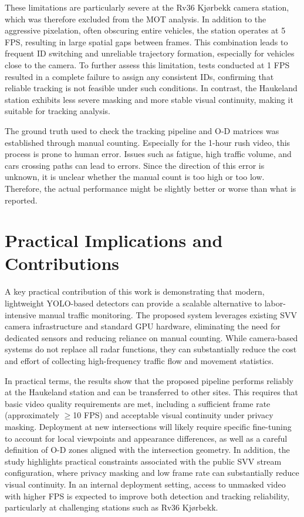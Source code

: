These limitations are particularly severe at the Rv36 Kjørbekk camera station, which was therefore excluded from the MOT analysis. In addition to the aggressive pixelation, often obscuring entire vehicles, the station operates at 5 FPS, resulting in large spatial gaps between frames. This combination leads to frequent ID switching and unreliable trajectory formation, especially for vehicles close to the camera. To further assess this limitation, tests conducted at 1 FPS resulted in a complete failure to assign any consistent IDs, confirming that reliable tracking is not feasible under such conditions. In contrast, the Haukeland station exhibits less severe masking and more stable visual continuity, making it suitable for tracking analysis.

The ground truth used to check the tracking pipeline and O-D matrices was established through manual counting. Especially for the 1-hour rush video, this process is prone to human error. Issues such as fatigue, high traffic volume, and cars crossing paths can lead to errors. Since the direction of this error is unknown, it is unclear whether the manual count is too high or too low. Therefore, the actual performance might be slightly better or worse than what is reported.

\section{Practical Implications and Contributions}
A key practical contribution of this work is demonstrating that modern, lightweight YOLO-based detectors can provide a scalable alternative to labor-intensive manual traffic monitoring. The proposed system leverages existing SVV camera infrastructure and standard GPU hardware, eliminating the need for dedicated sensors and reducing reliance on manual counting. While camera-based systems do not replace all radar functions, they can substantially reduce the cost and effort of collecting high-frequency traffic flow and movement statistics.

In practical terms, the results show that the proposed pipeline performs reliably at the Haukeland station and can be transferred to other sites. This requires that basic video quality requirements are met, including a sufficient frame rate (approximately $\geq$10 FPS) and acceptable visual continuity under privacy masking. Deployment at new intersections will likely require specific fine-tuning to account for local viewpoints and appearance differences, as well as a careful definition of O-D zones aligned with the intersection geometry. In addition, the study highlights practical constraints associated with the public SVV stream configuration, where privacy masking and low frame rate can substantially reduce visual continuity. In an internal deployment setting, access to unmasked video with higher FPS is expected to improve both detection and tracking reliability, particularly at challenging stations such as Rv36 Kjørbekk.


